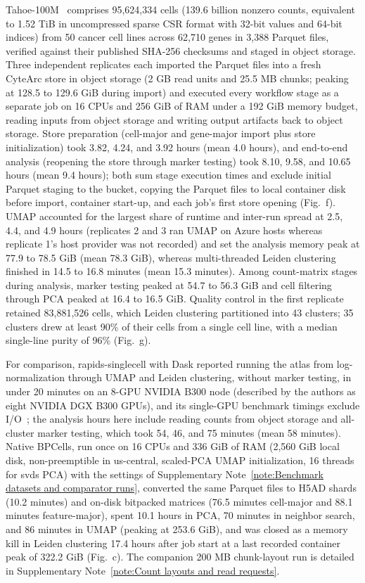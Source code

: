 Tahoe-100M~\cite{zhang2026tahoe100m} comprises 95,624,334 cells (139.6 billion nonzero counts, equivalent to 1.52 TiB in uncompressed sparse CSR format with 32-bit values and 64-bit indices) from 50 cancer cell lines across 62,710 genes in 3,388 Parquet files, verified against their published SHA-256 checksums and staged in object storage. Three independent replicates each imported the Parquet files into a fresh CyteArc store in object storage (2 GB read units and 25.5 MB chunks; peaking at 128.5 to 129.6 GiB during import) and executed every workflow stage as a separate job on 16 CPUs and 256 GiB of RAM under a 192 GiB memory budget, reading inputs from object storage and writing output artifacts back to object storage. Store preparation (cell-major and gene-major import plus store initialization) took 3.82, 4.24, and 3.92 hours (mean 4.0 hours), and end-to-end analysis (reopening the store through marker testing) took 8.10, 9.58, and 10.65 hours (mean 9.4 hours); both sum stage execution times and exclude initial Parquet staging to the bucket, copying the Parquet files to local container disk before import, container start-up, and each job's first store opening (Fig.~f). UMAP accounted for the largest share of runtime and inter-run spread at 2.5, 4.4, and 4.9 hours (replicates 2 and 3 ran UMAP on Azure hosts whereas replicate 1's host provider was not recorded) and set the analysis memory peak at 77.9 to 78.5 GiB (mean 78.3 GiB), whereas multi-threaded Leiden clustering finished in 14.5 to 16.8 minutes (mean 15.3 minutes). Among count-matrix stages during analysis, marker testing peaked at 54.7 to 56.3 GiB and cell filtering through PCA peaked at 16.4 to 16.5 GiB. Quality control in the first replicate retained 83,881,526 cells, which Leiden clustering partitioned into 43 clusters; 35 clusters drew at least 90\% of their cells from a single cell line, with a median single-line purity of 96\% (Fig.~g).

For comparison, rapids-singlecell with Dask reported running the atlas from log-normalization through UMAP and Leiden clustering, without marker testing, in under 20 minutes on an 8-GPU NVIDIA B300 node (described by the authors as eight NVIDIA DGX B300 GPUs), and its single-GPU benchmark timings exclude I/O~\cite{dicks2026rapids}; the analysis hours here include reading counts from object storage and all-cluster marker testing, which took 54, 46, and 75 minutes (mean 58 minutes). Native BPCells, run once on 16 CPUs and 336 GiB of RAM (2,560 GiB local disk, non-preemptible in us-central, scaled-PCA UMAP initialization, 16 threads for svds PCA) with the settings of Supplementary Note~\ref{note:Benchmark datasets and comparator runs}, converted the same Parquet files to H5AD shards (10.2 minutes) and on-disk bitpacked matrices (76.5 minutes cell-major and 88.1 minutes feature-major), spent 10.1 hours in PCA, 70 minutes in neighbor search, and 86 minutes in UMAP (peaking at 253.6 GiB), and was closed as a memory kill in Leiden clustering 17.4 hours after job start at a last recorded container peak of 322.2 GiB (Fig.~c). The companion 200 MB chunk-layout run is detailed in Supplementary Note~\ref{note:Count layouts and read requests}.

